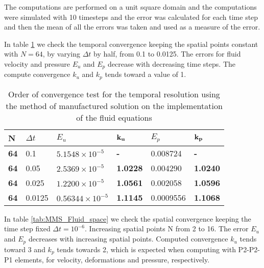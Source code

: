The computations are performed on a unit square domain and the computations were simulated with 10 timesteps and the error was calculated for each time step and then the mean of all the errors was taken and used as a measure of the error.

In table \ref{tab:MMS_Flu?id_time} we check the temporal convergence keeping the spatial points constant with $N=64$, by varying $\Delta t$ by half, from 0.1 to 0.0125. The errors for fluid velocity and pressure $E_u$ and $E_p$ decrease with decreasing time steps. The compute convergence $k_u$ and $k_p$ tends toward a value of 1.

\begin{table}[H]
\centering
\caption{Order of convergence test for the temporal resolution using the method of manufactured solution on the implementation of the fluid equations}
\label{tab:MMS_Flu?id_time}
\begin{tabular}{|l|l|l|l|l|l|}
\hline
\textbf{N} & $\Delta t$ & $E_u$ & $\bold{k_u}$ & $E_p$ & $\bold{k_p}$ \\ \hline
\textbf{64} & 0.1 & $5.1548 \times 10^{-5}$ & \textbf{-} & 0.008724 & \textbf{-} \\ \hline
\textbf{64} & 0.05 & $2.5369 \times 10^{-5}$ & \textbf{1.0228} & 0.004290 & \textbf{1.0240} \\ \hline
\textbf{64} & 0.025 & $1.2200 \times 10^{-5}$ & \textbf{1.0561} & 0.002058 & \textbf{1.0596} \\ \hline
\textbf{64} & 0.0125 & $0.56344 \times 10^{-5}$ & \textbf{1.1145} & 0.0009556 & \textbf{1.1068} \\ \hline
\end{tabular}
\end{table}

In table \ref{tab:MMS_Fluid_space} we check the spatial convergence keeping the time step fixed $\Delta t=10^{-6}$. Increasing spatial points N from 2 to 16. The error $E_u$ and $E_p$ decreases with increasing spatial points. Computed convergence $k_u$ tends toward 3 and $k_p$ tends towards 2, which is expected when computing with P2-P2-P1 elements, for velocity, deformations and pressure, respectively.

